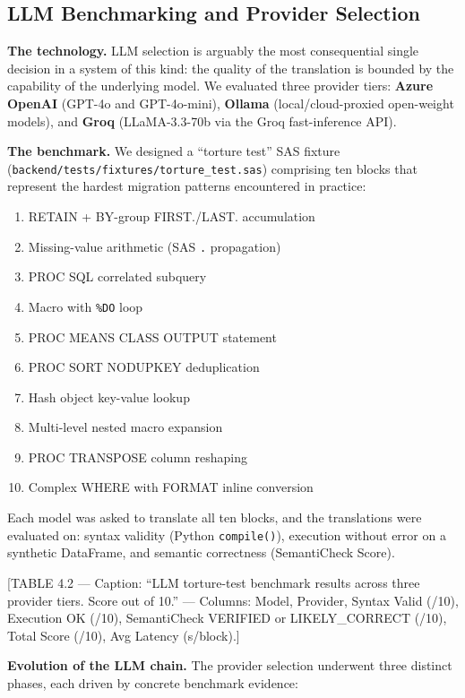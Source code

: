 \subsection{LLM Benchmarking and Provider Selection}
\label{subsec:llm-benchmarking}

\textbf{The technology.} LLM selection is arguably the most consequential
single decision in a system of this kind: the quality of the translation is
bounded by the capability of the underlying model. We evaluated three provider
tiers: \textbf{Azure OpenAI} (GPT-4o and GPT-4o-mini), \textbf{Ollama}
(local/cloud-proxied open-weight models), and \textbf{Groq} (LLaMA-3.3-70b
via the Groq fast-inference API).

\textbf{The benchmark.} We designed a ``torture test'' SAS fixture
(\texttt{backend/tests/fixtures/torture\_test.sas}) comprising ten blocks
that represent the hardest migration patterns encountered in practice:

\begin{enumerate}
  \item RETAIN + BY-group FIRST./LAST. accumulation
  \item Missing-value arithmetic (SAS \texttt{.} propagation)
  \item PROC SQL correlated subquery
  \item Macro with \texttt{\%DO} loop
  \item PROC MEANS CLASS OUTPUT statement
  \item PROC SORT NODUPKEY deduplication
  \item Hash object key-value lookup
  \item Multi-level nested macro expansion
  \item PROC TRANSPOSE column reshaping
  \item Complex WHERE with FORMAT inline conversion
\end{enumerate}

Each model was asked to translate all ten blocks, and the translations were
evaluated on: syntax validity (Python \texttt{compile()}), execution without
error on a synthetic DataFrame, and semantic correctness (SemantiCheck Score).

[TABLE 4.2 --- Caption: ``LLM torture-test benchmark results across three
provider tiers. Score out of 10.'' --- Columns: Model, Provider, Syntax
Valid (/10), Execution OK (/10), SemantiCheck VERIFIED or LIKELY\_CORRECT (/10),
Total Score (/10), Avg Latency (s/block).]

\textbf{Evolution of the LLM chain.} The provider selection underwent three
distinct phases, each driven by concrete benchmark evidence:

